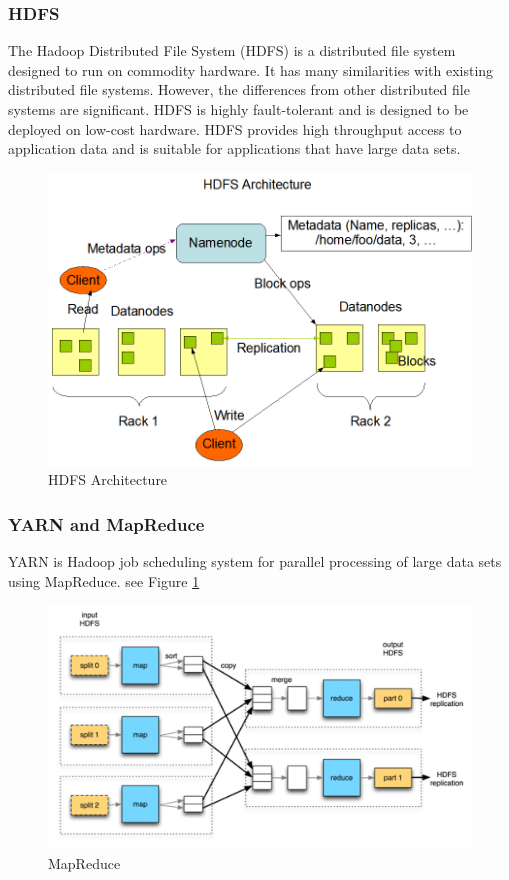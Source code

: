 \documentclass[11pt, oneside]{article}   	%
\begin{document}
\subsubsection{HDFS\texttrademark}
The Hadoop Distributed File System (HDFS) is a distributed file system designed to run on commodity hardware. It has many similarities with existing distributed file systems. However, the differences from other distributed file systems are significant. HDFS is highly fault-tolerant and is designed to be deployed on low-cost hardware. HDFS provides high throughput access to application data and is suitable for applications that have large data sets. 


\begin{figure}
  \centering
  \includegraphics[width=\linewidth]{hdfsarchitecture.png}
  \caption{HDFS Architecture}
\end{figure}

\subsubsection{YARN and MapReduce}
YARN is Hadoop job scheduling system for parallel processing of large data sets using MapReduce. see Figure \ref{fig:mr} 

\begin{figure}
  \centering
  \includegraphics[width=\linewidth]{hadoopfig2.png}
  \caption{MapReduce}
  \label{fig:mr}
\end{figure}
\end{document}
